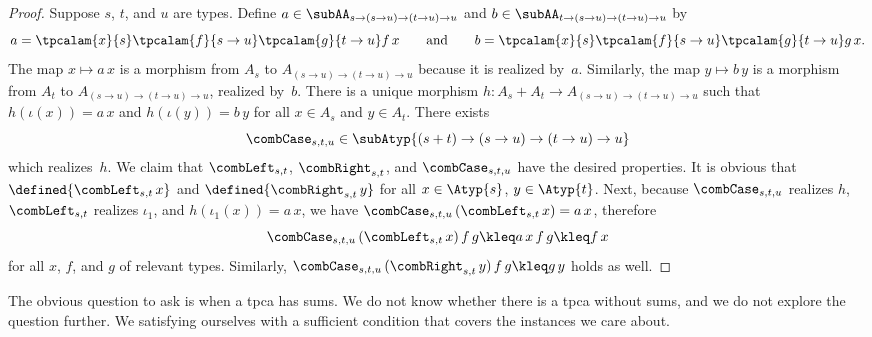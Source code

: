 \begin{proof}
  Suppose $s$, $t$, and $u$ are types. Define $a \in \subAA_{s \to (s
    \to u) \to (t \to u) \to u}$ and $b \in \subAA_{t \to (s \to u)
    \to (t \to u) \to u}$ by
  \begin{equation*}
    a = \tpcalam{x}{s}
        \tpcalam{f}{s \to u}
        \tpcalam{g}{t \to u}
        f\,x
   \qquad\text{and}\qquad
    b = \tpcalam{x}{s}
        \tpcalam{f}{s \to u}
        \tpcalam{g}{t \to u}
        g\,x.
  \end{equation*}
  The map $x \mapsto a\,x$ is a morphism from $A_s$ to
  $A_{(s \to u) \to (t \to u) \to u}$ because it is realized
  by~$a$. Similarly, the map $y \mapsto b\,y$ is a morphism from
  $A_t$ to $A_{(s \to u) \to (t \to u) \to u}$, realized
  by~$b$. There is a unique morphism $h : A_s + A_t \to
  A_{(s \to u) \to (t \to u) \to u}$ such that $h(\iota(x)) =
  a\,x$ and $h(\iota(y)) = b\,y$ for all $x \in A_s$ and $y \in
  A_t$. There exists
  \begin{equation*}
    \combCase_{s,t,u} \in \subAtyp{(s+t) \to (s \to u) \to (t \to u) \to u}
  \end{equation*}
  which realizes~$h$. We claim that $\combLeft_{s,t}$,
  $\combRight_{s,t}$, and $\combCase_{s,t,u}$ have the desired
  properties. It is obvious that $\defined{\combLeft_{s,t}\,x}$ and
  $\defined{\combRight_{s,t}\,y}$ for all $x \in \Atyp{s}$, $y \in
  \Atyp{t}$. Next, because $\combCase_{s,t,u}$ realizes $h$,
  $\combLeft_{s,t}$ realizes $\iota_1$, and $h(\iota_1(x)) = a\,x$, we
  have $\combCase_{s,t,u}\,(\combLeft_{s,t}\,x) = a\,x$, therefore
  \begin{equation*}
    \combCase_{s,t,u}\,(\combLeft_{s,t}\,x)\,f\,g \kleq
    a\,x\,f\,g \kleq f\,x
  \end{equation*}
  for all $x$, $f$, and $g$ of relevant types. Similarly,
  $\combCase_{s,t,u}\,(\combRight_{s,t}\,y)\,f\,g \kleq g\,y$ holds
  as well.
\end{proof}

The obvious question to ask is when a tpca has sums. We do not know
whether there is a tpca without sums, and we do not explore the
question further. We satisfying ourselves with a sufficient condition
that covers the instances we care about.

